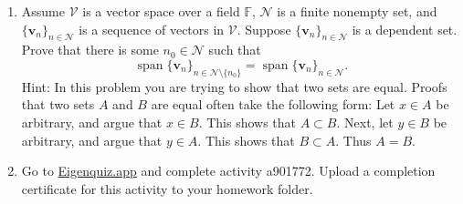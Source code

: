 \documentclass[12pt]{amsart}
\newcommand{\1}{\mathbbm{1}}
\numberwithin{equation}{section}
\numberwithin{Theorem}{section}
\theoremstyle{plain} %
\theoremstyle{definition}
\theoremstyle{remark}
\begin{document}
\begin{enumerate}[1.]
\item Assume \(\mathcal{V}\) is a vector space over a field \(\mathbb{F}\), \(\mathcal{N}\) is a finite nonempty set, and \(\{\mathbf{v}_{n}\}_{n\in\mathcal{N}}\) is a sequence of vectors in \(\mathcal{V}\). Suppose \(\{\mathbf{v}_{n}\}_{n\in\mathcal{N}}\) is a dependent set.  Prove that there is some \(n_{0}\in\mathcal{N}\) such that
\[\operatorname{span}\{\mathbf{v}_{n}\}_{n\in\mathcal{N}\setminus\{n_{0}\}} = \operatorname{span}\{\mathbf{v}_{n}\}_{n\in\mathcal{N}}.\]
Hint: In this problem you are trying to show that two sets are equal. Proofs that two sets \(A\) and \(B\) are equal often take the following form: Let \(x\in A\) be arbitrary, and argue that \(x\in B\). This shows that \(A\subset B\). Next, let \(y\in B\) be arbitrary, and argue that \(y\in A\). This shows that \(B\subset A\). Thus \(A=B\).

\bigskip



\item Go to \href{https://eigenquiz.app/}{Eigenquiz.app} and complete activity a901772. Upload a completion certificate for this activity to your homework folder.
\end{enumerate}
\end{document}
